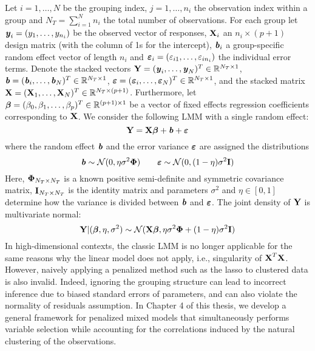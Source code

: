 Let $i = 1, \ldots, N$ be the grouping index, $j = 1, \ldots, n_i$ the observation index within a group and $N_T = \sum_{i=1}^{N} n_i$ the total number of observations. For each group let \mbox{$\textbf{\emph{y}}_i = (y_1, \ldots, y_{n_i})$} be the observed vector of responses, $\textbf{X}_i$ an $n_i \times (p + 1)$ design matrix (with the column of 1s for the intercept), $\textbf{\emph{b}}_i$ a group-specific random effect vector of length $n_i$ and \mbox{$\boldsymbol{\varepsilon}_i = (\varepsilon_{i1}, \ldots, \varepsilon_{in_i})$} the individual error terms. Denote the stacked vectors \mbox{$\textbf{Y} = (\textbf{\emph{y}}_i, \ldots, \textbf{\emph{y}}_N)^T \in \mathbb{R}^{N_T \times 1}$}, $\textbf{\emph{b}} = (\textbf{\emph{b}}_i, \ldots, \textbf{\emph{b}}_N)^T \in \mathbb{R}^{N_T \times 1}$, \mbox{$\boldsymbol{\varepsilon} = (\boldsymbol{\varepsilon}_i, \ldots, \boldsymbol{\varepsilon}_N)^T \in \mathbb{R}^{N_T \times 1}$}, and the stacked matrix \\\mbox{$\textbf{X} = (\textbf{X}_1, \ldots, \textbf{X}_N)^T \in \mathbb{R}^{N_T \times (p + 1)}$}. Furthermore, let $\boldsymbol{\beta} = (\beta_0,\beta_1, \ldots, \beta_p)^T \in \mathbb{R}^{(p+1) \times 1}$ be a vector of fixed effects regression coefficients corresponding to $\textbf{X}$. We consider the following LMM with a single random effect:
\begin{equation}
\textbf{Y} = \textbf{X} \boldsymbol{\beta} + \textbf{\emph{b}} + \boldsymbol{\varepsilon}
\end{equation}
where the random effect $\textbf{\emph{b}}$ and the error variance $\boldsymbol{\varepsilon}$ are assigned the distributions
\begin{equation}
\textbf{\emph{b}} \sim \mathcal{N}(0, \eta \sigma^2 \boldsymbol{\Phi}) \qquad \boldsymbol{\varepsilon} \sim \mathcal{N}(0, (1-\eta)\sigma^2 \textbf{I})
\end{equation}
Here, $\boldsymbol{\Phi}_{N_T \times N_T}$ is a known positive semi-definite and symmetric covariance matrix, $\textbf{I}_{N_T \times N_T}$ is the identity matrix and parameters $\sigma^2$ and $\eta \in [0,1]$ determine how the variance is divided between $\textbf{\emph{b}}$ and $\boldsymbol{\varepsilon}$. The joint density of $\textbf{Y}$ is multivariate normal:
\begin{equation}
\textbf{Y} | (\boldsymbol{\beta}, \eta, \sigma^2) \sim \mathcal{N}(\textbf{X} \boldsymbol{\beta}, \eta \sigma^2 \boldsymbol{\Phi} + (1-\eta)\sigma^2 \textbf{I}) \label{eq:prinen-litreview}
\end{equation}
In high-dimensional contexts, the classic LMM is no longer applicable for the same reasons why the linear model does not apply, i.e., singularity of $\textbf{X}^T \textbf{X}$. However, naively applying a penalized method such as the lasso to clustered data is also invalid. Indeed, ignoring the grouping structure can lead to incorrect inference due to biased standard errors of parameters, and can also violate the normality of residuals assumption. In Chapter 4 of this thesis, we develop a general framework for penalized mixed models that simultaneously performs variable selection while accounting for the correlations induced by the natural clustering of the observations. 


